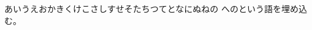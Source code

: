 \documentclass[paper=a5]{jlreq}
\begin{document}
\noindent あいうえおかきくけこさしすせそたちつてとなにぬねの
へのという語を埋め込む。
\end{document}
